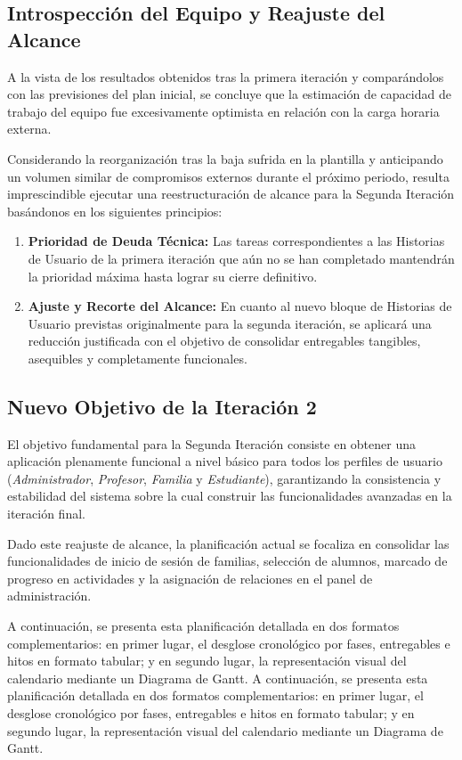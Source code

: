 \subsection{Introspección del Equipo y Reajuste del Alcance}

A la vista de los resultados obtenidos tras la primera iteración y comparándolos con las previsiones del plan inicial, se concluye que la estimación de capacidad de trabajo del equipo fue excesivamente optimista en relación con la carga horaria externa.

Considerando la reorganización tras la baja sufrida en la plantilla y anticipando un volumen similar de compromisos externos durante el próximo periodo, resulta imprescindible ejecutar una reestructuración de alcance para la Segunda Iteración basándonos en los siguientes principios:

\begin{enumerate}
    \item \textbf{Prioridad de Deuda Técnica:} Las tareas correspondientes a las Historias de Usuario de la primera iteración que aún no se han completado mantendrán la prioridad máxima hasta lograr su cierre definitivo.
    \item \textbf{Ajuste y Recorte del Alcance:} En cuanto al nuevo bloque de Historias de Usuario previstas originalmente para la segunda iteración, se aplicará una reducción justificada con el objetivo de consolidar entregables tangibles, asequibles y completamente funcionales.
\end{enumerate}

\subsection{Nuevo Objetivo de la Iteración 2}

El objetivo fundamental para la Segunda Iteración consiste en obtener una aplicación plenamente funcional a nivel básico para todos los perfiles de usuario (\textit{Administrador}, \textit{Profesor}, \textit{Familia} y \textit{Estudiante}), garantizando la consistencia y estabilidad del sistema sobre la cual construir las funcionalidades avanzadas en la iteración final.

Dado este reajuste de alcance, la planificación actual se focaliza en consolidar las funcionalidades de inicio de sesión de familias, selección de alumnos, marcado de progreso en actividades y la asignación de relaciones en el panel de administración.

A continuación, se presenta esta planificación detallada en dos formatos complementarios: en primer lugar, el desglose cronológico por fases, entregables e hitos en formato tabular; y en segundo lugar, la representación visual del calendario mediante un Diagrama de Gantt.
A continuación, se presenta esta planificación detallada en dos formatos complementarios: en primer lugar, el desglose cronológico por fases, entregables e hitos en formato tabular; y en segundo lugar, la representación visual del calendario mediante un Diagrama de Gantt.
